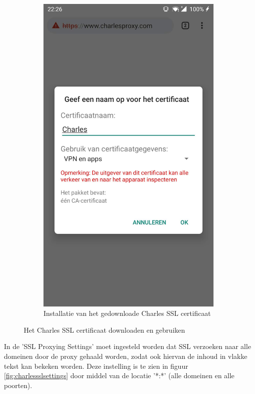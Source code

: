 \begin{figure}
\begin{subfigure}{.5\textwidth}
    \end{subfigure}%
    \begin{subfigure}{.5\textwidth}
        \centering
        \includegraphics[width=0.8\linewidth]{img/charlessslcertificateinstall.jpg}
        \caption{Installatie van het gedownloade Charles SSL certificaat}
        \label{fig:charlessslcertificateinstall}
    \end{subfigure}
    \caption{Het Charles SSL certificaat downloaden en gebruiken}
\end{figure}

In de 'SSL Proxying Settings' moet ingesteld worden dat SSL  verzoeken naar alle domeinen door de proxy gehaald worden, zodat ook hiervan de inhoud in vlakke tekst kan bekeken worden. Deze instelling is te zien in figuur \ref{fig:charlessslsettings} door middel van de locatie '*:*' (alle domeinen en alle poorten).

